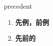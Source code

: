 
\begin{frame}
{\huge precedent}
\begin{center}
\begin{enumerate}\Large
  \item \textbf{先例，前例}
  \item \textbf{先前的}
\end{enumerate}
\end{center}
\end{frame}
